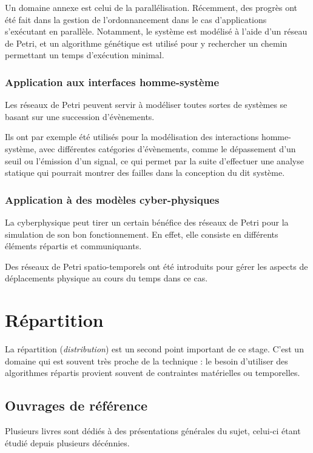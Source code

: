 Un domaine annexe est celui de la parallélisation. Récemment, des progrès ont été fait dans la gestion de l'ordonnancement dans le cas d'applications s'exécutant en parallèle\cite{chen2014research}. Notamment, le système est modélisé à l'aide d'un réseau de Petri, et un algorithme génétique est utilisé pour y rechercher un chemin permettant un temps d'exécution minimal. 

\subsubsection{Application aux interfaces homme-système}
Les réseaux de Petri peuvent servir à modéliser toutes sortes de systèmes se basant sur une succession d'évènements.
 
Ils ont par exemple été utilisés pour la modélisation des interactions homme-système\cite{campos2014elementary}, avec différentes catégories d'évènements, comme le dépassement d'un seuil ou l'émission d'un signal, ce qui permet par la suite d'effectuer une analyse statique qui pourrait montrer des failles dans la conception du dit système.

\subsubsection{Application à des modèles cyber-physiques}
La \gls{cyberphysique} peut tirer un certain bénéfice des réseaux de Petri pour la simulation de son bon fonctionnement. En effet, elle consiste en différents éléments répartis et communiquants.

Des réseaux de Petri spatio-temporels ont été introduits\cite{zhang2014modeling} pour gérer les aspects de déplacements physique au cours du temps dans ce cas.

\section{Répartition}
La répartition (\textit{distribution}) est un second point important de ce stage. C'est un domaine qui est souvent très proche de la technique : le besoin d'utiliser des algorithmes répartis provient souvent de contraintes matérielles ou temporelles.

\subsection{Ouvrages de référence}
Plusieurs livres sont dédiés à des présentations générales du sujet, celui-ci étant étudié depuis plusieurs décénnies.

